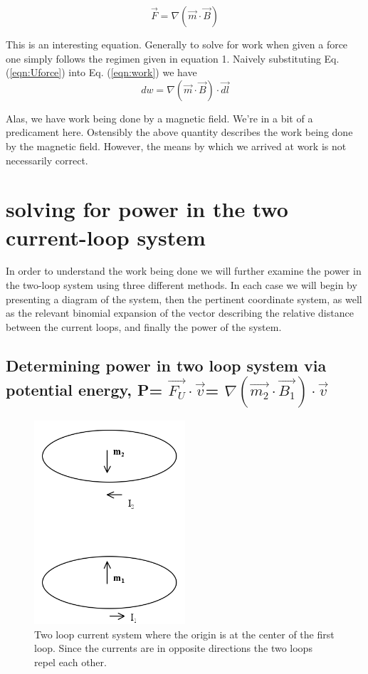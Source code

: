 \documentclass[12pt]{revtex4}
\begin{document}
\begin{equation}
\label{eqn:Uforce}
\vec{F}=\nabla (\vec{m} \cdot \vec{B})
\end{equation}

This is an interesting equation.  Generally to solve for work when given a force one simply follows the regimen given in equation 1.  Naively substituting Eq. (\ref{eqn:Uforce}) into Eq. (\ref{eqn:work}) we have 
\begin{equation}
\label{eqn:dwork}
dw=\nabla (\vec{m} \cdot \vec{B}) \cdot \vec{dl}
\end{equation}


Alas, we have work being done by a magnetic field.  We're in a bit of a predicament here. Ostensibly the above quantity describes the work being done by the magnetic field. However, the means by which we arrived at work is not necessarily correct. 


\newpage
\section{solving for power in the two current-loop system}
In order to understand the work being done we will further examine the power in the two-loop system using three different methods.  In each case we will begin by presenting a diagram of the system, then the pertinent coordinate system, as well as the relevant binomial expansion of the vector describing the relative distance between the current loops, and finally the power of the system.  


\subsection{Determining power in two loop system via potential energy, P= $\vec{F_{U}} \cdot \vec{v}$= $\nabla (\vec{m_2} \cdot \vec{B_1}) \cdot \vec{v}$}

\begin{figure}[h]
\begin{center}
\includegraphics[width=0.5\textwidth]{mm.png} 
\end{center}
\caption{\label{fig:2loop} Two loop current system where the origin is at the center of the first loop.  Since the currents are in opposite directions the two loops repel each other. 
}
\end{figure}      
\end{document}
